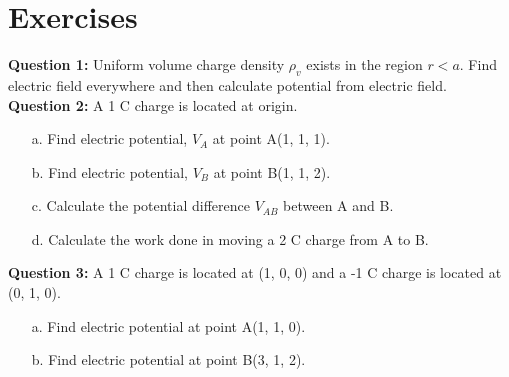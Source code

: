 \documentclass[12pt,a4paper]{article}
\begin{document}
\section{Exercises}
\noindent\textbf{Question 1:} Uniform volume charge density $\rho_v$ exists in the region $r<a$. Find electric field everywhere and then calculate potential from electric field.\\[0.2cm]
\noindent\textbf{Question 2:} A 1 C charge is located at origin.
\begin{itemize}
\item[a.] Find electric potential, $V_A$ at point A(1, 1, 1).
\item[b.] Find electric potential, $V_B$ at point B(1, 1, 2).
\item[c.] Calculate the potential difference $V_{AB}$ between A and B.
\item[d.] Calculate the work done in moving a 2 C charge from A to B.
\end{itemize}
\noindent\textbf{Question 3:} A 1 C charge is located at (1, 0, 0) and a -1 C charge is located at (0, 1, 0).
\begin{itemize}
\item[a.] Find electric potential at point A(1, 1, 0).
\item[b.] Find electric potential at point B(3, 1, 2).
\end{itemize}
%
%
\end{document}
